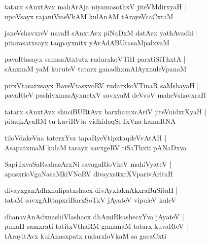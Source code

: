 \documentclass[twoside,12pt,openright]{book}
\newcounter{shloka}[chapter]
\begin{document}
\begin{shloka}
tatarx sAnxtAvx mahArAja niyamasothxV jiteVMdirxyaH |\\
upoVsayx rajaniVmeVkAM  kulAnAM tArayeVcaCxtaM 
\end{shloka}

\begin{shloka}
janeVshavxreV naraH sAnxtAvx piNaDxM datAvx yathAvadhi |\\
pitarasatxsayx taqpayxnitx yAvAdABUtasaMpalxvaM 
\end{shloka}

\begin{shloka}
pavaRtasayx samanAtxtutx rudarxkoVTiH parxtiSiThxtA |\\
sAnxnaM  yaM kuruteV tatarx ganadhxmAlAyxnuleVpanaM 
\end{shloka}

\begin{shloka}
pirxVtasatxsayx BaveVtasxvoRV rudarxkoVTinaR saMshayaH |\\
pavaRteV pashivxmasAyxnetxV savxyaM deVvoV maheVshavxraH 
\end{shloka}

\begin{shloka}
tatarx sAnxtAvx shuciBURtAvx barxhamxcAriV jiteVnidxrXyaH |\\
pitaqkAyaRM tu kuviRVta vidhidaqSeTxVna kamaRNA 
\end{shloka}

\begin{shloka}
tiloVdakeVna taterxYva tapaRyeVtipxtaqdeVvAtAH |\\
AsapatxmaM kulaM tasayx savxgeRV tiSaThxti pANaDxva 
\end{shloka}

\begin{shloka}
SapiTxvaSaRsahasArxNi savagaRloVkeV mahiVyateV |\\
apasxrioVgaNasaMkiVNoRV divayxsitxrXVparivAritaH 
\end{shloka}

\begin{shloka}
divayxganAdhxnulipatxshacx divAyxlaknAkxraBuSitaH |\\
tataM savxgARtapxriBarxSoTxV jAyateV vipuleV kuleV 
\end{shloka}

\begin{shloka}
dhanavAnAdxnashiVlashacx dhAmiRkashecxYva jAyateV |\\
punaH samxrati tatitxVthaRM gamanaM tatarx kuvaRteV |\\
tArayitAvx kulAnasxpatx rudarxloVkaM sa gacaCxti 
\end{shloka}
\end{document}
